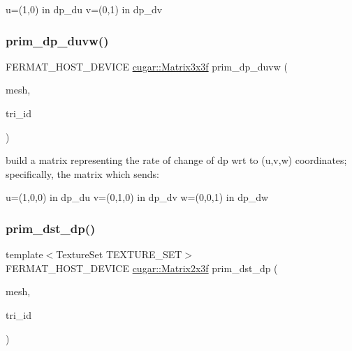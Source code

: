 u=(1,0) in dp\+\_\+du v=(0,1) in dp\+\_\+dv \mbox{\label{group___mesh_module_ga614c297649ecb916e613cc928ccd5f76}} 
\subsubsection{\texorpdfstring{prim\+\_\+dp\+\_\+duvw()}{prim\_dp\_duvw()}}
{\footnotesize\ttfamily F\+E\+R\+M\+A\+T\+\_\+\+H\+O\+S\+T\+\_\+\+D\+E\+V\+I\+CE \hyperlink{structcugar_1_1_matrix}{cugar\+::\+Matrix3x3f} prim\+\_\+dp\+\_\+duvw (\begin{DoxyParamCaption}\item[{const \hyperlink{struct_mesh_view}{Mesh\+View} \&}]{mesh,  }\item[{const uint32}]{tri\+\_\+id }\end{DoxyParamCaption})\hspace{0.3cm}{\ttfamily [inline]}}

build a matrix representing the rate of change of dp wrt to (u,v,w) coordinates; specifically, the matrix which sends\+:

u=(1,0,0) in dp\+\_\+du v=(0,1,0) in dp\+\_\+dv w=(0,0,1) in dp\+\_\+dw \mbox{\label{group___mesh_module_ga1976fb01efbfc722e78de1f5415c606e}} 
\subsubsection{\texorpdfstring{prim\+\_\+dst\+\_\+dp()}{prim\_dst\_dp()}}
{\footnotesize\ttfamily template$<$Texture\+Set T\+E\+X\+T\+U\+R\+E\+\_\+\+S\+ET$>$ \\
F\+E\+R\+M\+A\+T\+\_\+\+H\+O\+S\+T\+\_\+\+D\+E\+V\+I\+CE \hyperlink{structcugar_1_1_matrix}{cugar\+::\+Matrix2x3f} prim\+\_\+dst\+\_\+dp (\begin{DoxyParamCaption}\item[{const \hyperlink{struct_mesh_view}{Mesh\+View} \&}]{mesh,  }\item[{const uint32}]{tri\+\_\+id }\end{DoxyParamCaption})\hspace{0.3cm}{\ttfamily [inline]}}

